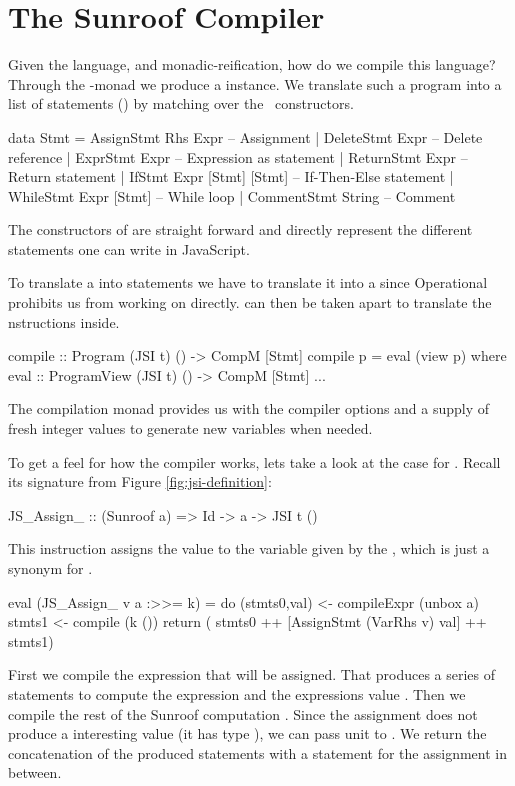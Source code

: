  
\section{The Sunroof Compiler}
\label{sec:compiler}

Given the language, and monadic-reification, how do we compile this language?
Through the \JS-monad we produce a  instance. We 
translate such a program into a list of statements () by matching over 
the \JSI~constructors.
\begin{Code}
data Stmt 
  = AssignStmt Rhs Expr       -- Assignment
  | DeleteStmt Expr           -- Delete reference
  | ExprStmt Expr             -- Expression as statement
  | ReturnStmt Expr           -- Return statement
  | IfStmt Expr [Stmt] [Stmt] -- If-Then-Else statement
  | WhileStmt Expr [Stmt]     -- While loop
  | CommentStmt String        -- Comment
\end{Code}
The constructors of  are straight forward and
directly represent the different statements one can write
in JavaScript.

To translate a  into statements we
have to translate it into a  since 
Operational prohibits us from working on  directly.
 can then be taken apart to translate 
the \JSI nstructions inside.
\begin{Code}
compile :: Program (JSI t) () -> CompM [Stmt]
compile p = eval (view p)
  where
    eval :: ProgramView (JSI t) () -> CompM [Stmt]
    ...
\end{Code}
The compilation monad  provides us with 
the compiler options and a supply of fresh integer
values to generate new variables when needed.

To get a feel for how the compiler works, lets take a look at 
the case for . Recall its signature from 
Figure \ref{fig:jsi-definition}:
\begin{Code}
JS_Assign_ :: (Sunroof a) => Id -> a -> JSI t ()
\end{Code}
This instruction assigns the value  to the 
variable given by the , which is just a synonym for .
\begin{Code}
eval (JS_Assign_ v a :>>= k) = do
      (stmts0,val) <- compileExpr (unbox a)
      stmts1       <- compile (k ())
      return ( stmts0 ++ [AssignStmt (VarRhs v) val] ++ stmts1)
\end{Code}
First we compile the expression that will be assigned. That
produces a series of statements to compute the expression and 
the expressions value .
Then we compile the rest of the Sunroof computation . Since 
the assignment does not produce a interesting value (it has type ),
we can pass unit to .
We return the concatenation of the produced statements with a statement 
for the assignment in between. 

